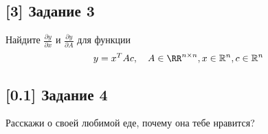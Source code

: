 \documentclass[12pt, a4paper, oneside]{article}
\begin{document}
\vspace{-0.5cm}
\subsection*{[3] Задание 3}
\vspace{-0.5cm}
Найдите $\frac{\partial y}{\partial x}$ и  $\frac{\partial y}{\partial A}$ для функции
\[
y = x^TAc , \quad A\in \RR^{n \times n}, x\in \mathbb{R}^{n}, c\in \mathbb{R}^{n} 
\]

\vspace{-0.5cm}
\subsection*{[0.1] Задание 4}
\vspace{-0.5cm}
Расскажи о своей любимой еде, почему она тебе нравится?
\end{document}
